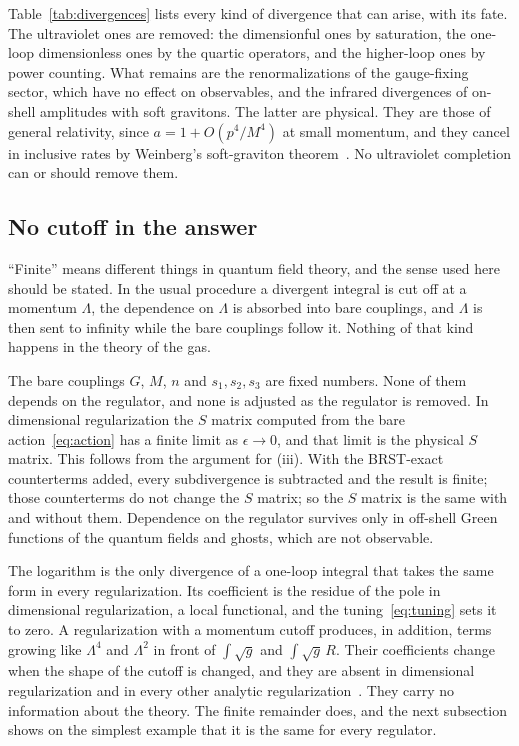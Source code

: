\documentclass[a4paper,11pt]{article}
\begin{document}
Table~\ref{tab:divergences} lists every kind of divergence that can arise, with its fate. The ultraviolet ones are removed: the dimensionful ones by saturation, the one-loop dimensionless ones by the quartic operators, and the higher-loop ones by power counting. What remains are the renormalizations of the gauge-fixing sector, which have no effect on observables, and the infrared divergences of on-shell amplitudes with soft gravitons. The latter are physical. They are those of general relativity, since $a=1+O(p^4/M^4)$ at small momentum, and they cancel in inclusive rates by Weinberg's soft-graviton theorem~\cite{Weinberg1965}. No ultraviolet completion can or should remove them.

\subsection{No cutoff in the answer}
\label{sec:nocutoff}

``Finite'' means different things in quantum field theory, and the sense used here should be stated. In the usual procedure a divergent integral is cut off at a momentum $\Lambda$, the dependence on $\Lambda$ is absorbed into bare couplings, and $\Lambda$ is then sent to infinity while the bare couplings follow it. Nothing of that kind happens in the theory of the gas.

The bare couplings $G$, $M$, $n$ and $s_1,s_2,s_3$ are fixed numbers. None of them depends on the regulator, and none is adjusted as the regulator is removed. In dimensional regularization the $S$ matrix computed from the bare action~\eqref{eq:action} has a finite limit as $\epsilon\to0$, and that limit is the physical $S$ matrix. This follows from the argument for (iii). With the BRST-exact counterterms added, every subdivergence is subtracted and the result is finite; those counterterms do not change the $S$ matrix; so the $S$ matrix is the same with and without them. Dependence on the regulator survives only in off-shell Green functions of the quantum fields and ghosts, which are not observable.

The logarithm is the only divergence of a one-loop integral that takes the same form in every regularization. Its coefficient is the residue of the pole in dimensional regularization, a local functional, and the tuning~\eqref{eq:tuning} sets it to zero. A regularization with a momentum cutoff produces, in addition, terms growing like $\Lambda^4$ and $\Lambda^2$ in front of $\int\sqrt g$ and $\int\sqrt g\,R$. Their coefficients change when the shape of the cutoff is changed, and they are absent in dimensional regularization and in every other analytic regularization~\cite{Collins1984}. They carry no information about the theory. The finite remainder does, and the next subsection shows on the simplest example that it is the same for every regulator.
\end{document}
